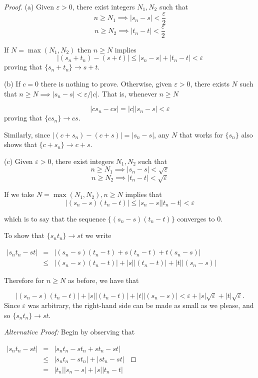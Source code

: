 \begin{proof}
(a)  Given $\varepsilon > 0$, there exist integers $N_1, N_2$ such that 
\[n \geq N_1 \implies |s_n - s|< \frac{\varepsilon}{2}\]
\[n \geq N_2 \implies |t_n - t|< \frac{\varepsilon}{2}\]

If $N = \max(N_1, N_2)$ then $n\geq N$ implies
\[|(s_n + t_n)-(s + t)|\leq |s_n - s|+|t_n - t|<\varepsilon\] proving that $\{s_n + t_n\} \to s+t$.

(b)  If $c = 0$ there is nothing to prove.  Otherwise, given $\varepsilon>0$, there exists $N$ such that $n\geq N \implies |s_n-s|<\varepsilon/ |c|$.  That is, whenever $n\geq N$

\[|cs_n -cs |= |c||s_n - s|< \varepsilon\]  proving that $\{cs_n\} \to cs$.

Similarly, since $|(c+s_n) - (c+s)| = |s_n - s|$, any $N$ that works for $\{s_n\}$ also shows that $\{c+s_n\} \to c+s$.

(c) Given $\varepsilon > 0$, there exist integers $N_1, N_2$ such that 
\[n \geq N_1 \implies |s_n - s|< \sqrt{\varepsilon}\]
\[n \geq N_2 \implies |t_n - t|< \sqrt{\varepsilon}\]

If we take $N = \max(N_1, N_2), n\geq N$ implies that 
\[|(s_n -s )(t_n -t)| \leq |s_n - s| |t_n -t| < \varepsilon\]

which is to say that the sequence $\{(s_n - s)(t_n - t)\}$ converges to 0.

To show that $\{s_n t_n \} \to st$ we write 


$\begin{array} {lcl} 
|s_n t_n  - st|& = &|(s_n - s) (t_n - t) + s(t_n -t) + t(s_n - s)|\\ 


& \leq & |(s_n - s) (t_n - t)| + |s||(t_n -t) |+ |t||(s_n - s)|    \end{array}$

Therefore for $n  \geq N$ as before, we have that 

\[|(s_n - s) (t_n - t)| + |s||(t_n -t) |+ |t||(s_n - s)| < \varepsilon + |s| \sqrt{\varepsilon} + |t| \sqrt{\varepsilon}.\]
Since $\varepsilon$ was arbitrary, the right-hand side can be made as small as we please, and so $\{s_n t_n\} \to st$.



\emph{Alternative Proof:}  Begin by observing that 


$\begin{array} {lcl} 
|s_n t_n  - st|& = &|s_n t_n - st_n + st_n  -st|\\ 
& \leq & |s_n t_n - st_n| + |st_n  -st|\\
&=	& |t_n||s_n - s| + |s||t_n - t| 
    \end{array}$
    

\end{proof}
